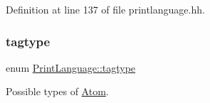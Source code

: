 Definition at line 137 of file printlanguage.\+hh.

\mbox{\label{class_print_language_a7102f70f47777d8b17af52c5157c473e}} 
\subsubsection{\texorpdfstring{tagtype}{tagtype}}
{\footnotesize\ttfamily enum \mbox{\hyperlink{class_print_language_a7102f70f47777d8b17af52c5157c473e}{Print\+Language\+::tagtype}}}



Possible types of \mbox{\hyperlink{struct_print_language_1_1_atom}{Atom}}. 

